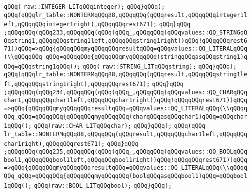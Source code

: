 \verb|qQQq(|\newline
\verb|raw::INTEGER_LITqQQqinteger);|\newline
\verb|qQQq}qQQq);|\newline
\verb|qQQq(qQQqlr_table::NONTERMqQQq88,qQQqqQQq(qQQqresult,qQQqqQQqinteger1left,qQQqqQQqinteger1right),qQQqqQQqrest671);|\newline
\verb|qQQq}qQQq|\newline
\verb|;qQQqqQQq(qQQq233,qQQqqQQq(qQQq(qQQq_,qQQqqQQq(qQQqvalues::QQ_STRINGqQQqstring1,qQQqqQQqstring1left,qQQqqQQqstring1right))qQQq!qQQqqQQqrest671))qQQq=>qQQq{qQQqqQQqmyqQQqqQQqresultqQQq=qQQqvalues::QQ_LITERALqQQq(\\qQQqqQQq_qQQq=qQQqqQQq{qQQqqQQqmyqQQqqQQq(stringqQQqasqQQqstring1)qQQq=qQQqstring1qQQq();|\newline
\verb|qQQq(|\newline
\verb|raw::STRING_LITqQQqstring);|\newline
\verb|qQQq}qQQq);|\newline
\verb|qQQq(qQQqlr_table::NONTERMqQQq88,qQQqqQQq(qQQqresult,qQQqqQQqstring1left,qQQqqQQqstring1right),qQQqqQQqrest671);|\newline
\verb|qQQq}qQQq|\newline
\verb|;qQQqqQQq(qQQq234,qQQqqQQq(qQQq(qQQq_,qQQqqQQq(qQQqvalues::QQ_CHARqQQqchar1,qQQqqQQqchar1left,qQQqqQQqchar1right))qQQq!qQQqqQQqrest671))qQQq=>qQQq{qQQqqQQqmyqQQqqQQqresultqQQq=qQQqvalues::QQ_LITERALqQQq(\\qQQqqQQq_qQQq=qQQqqQQq{qQQqqQQqmyqQQqqQQq(charqQQqasqQQqchar1)qQQq=qQQqchar1qQQq();|\newline
\verb|qQQq(raw::CHAR_LITqQQqchar);|\newline
\verb|qQQq}qQQq);|\newline
\verb|qQQq(qQQq|\newline
\verb|lr_table::NONTERMqQQq88,qQQqqQQq(qQQqresult,qQQqqQQqchar1left,qQQqqQQqchar1right),qQQqqQQqrest671);|\newline
\verb|qQQq}qQQq|\newline
\verb|;qQQqqQQq(qQQq235,qQQqqQQq(qQQq(qQQq_,qQQqqQQq(qQQqvalues::QQ_BOOLqQQqbool1,qQQqqQQqbool1left,qQQqqQQqbool1right))qQQq!qQQqqQQqrest671))qQQq=>qQQq{qQQqqQQqmyqQQqqQQqresultqQQq=qQQqvalues::QQ_LITERALqQQq(\\qQQqqQQq_qQQq=qQQqqQQq{qQQqqQQqmyqQQqqQQq(boolqQQqasqQQqbool1)qQQq=qQQqbool1qQQq();|\newline
\verb|qQQq(raw::BOOL_LITqQQqbool);|\newline
\verb|qQQq}qQQq);|\newline

